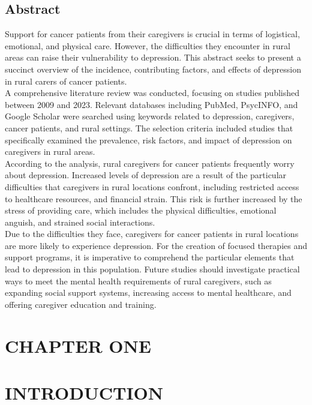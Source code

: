\documentclass[12pt]{article}\usepackage[]{graphicx}\usepackage[]{xcolor}
\numberwithin{equation}{section}
\numberwithin{figure}{section}
\begin{document}
	\newpage
	\subsection*{Abstract}
	Support for cancer patients from their caregivers is crucial in terms of logistical, emotional, and physical care. However, the difficulties they encounter in rural areas can raise their vulnerability to depression. This abstract seeks to present a succinct overview of the incidence, contributing factors, and effects of depression in rural carers of cancer patients.\\
	A comprehensive literature review was conducted, focusing on studies published between 2009 and 2023. Relevant databases including PubMed, PsycINFO, and Google Scholar were searched using keywords related to depression, caregivers, cancer patients, and rural settings. The selection criteria included studies that specifically examined the prevalence, risk factors, and impact of depression on caregivers in rural areas.\\
	According to the analysis, rural caregivers for cancer patients frequently worry about depression. Increased levels of depression are a result of the particular difficulties that caregivers in rural locations confront, including restricted access to healthcare resources, and financial strain. This risk is further increased by the stress of providing care, which includes the physical difficulties, emotional anguish, and strained social interactions.\\
	Due to the difficulties they face, caregivers for cancer patients in rural locations are more likely to experience depression. For the creation of focused therapies and support programs, it is imperative to comprehend the particular elements that lead to depression in this population. Future studies should investigate practical ways to meet the mental health requirements of rural caregivers, such as expanding social support systems, increasing access to mental healthcare, and offering caregiver education and training.
	
	\clearpage
	
	\section*{CHAPTER ONE}
\section*{INTRODUCTION}
\setcounter{section}{1}
\setcounter{subsection}{0}
\end{document}
